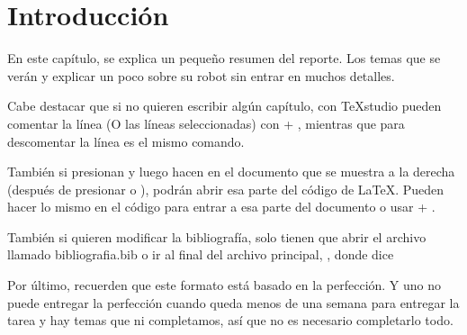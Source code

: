 \chapter{Introducción} \label{chap:introduccion}

En este capítulo, se explica un pequeño resumen del reporte. Los temas que se verán y explicar un poco sobre su robot sin entrar en muchos detalles.

Cabe destacar que si no quieren escribir algún capítulo, con \TeX studio pueden comentar la línea (O las líneas seleccionadas) con  + , mientras que para descomentar la línea es el mismo comando.

También si presionan  y luego hacen  en el documento que se muestra a la derecha (después de presionar  o ), podrán abrir esa parte del código de \LaTeX. Pueden hacer lo mismo en el código para entrar a esa parte del documento o usar  + .

También si quieren modificar la bibliografía, solo tienen que abrir el archivo llamado bibliografia.bib o ir al final del archivo principal, , donde dice

%		
%	

Por último, recuerden que este formato está basado en la perfección. Y uno no puede entregar la perfección cuando queda menos de una semana para entregar la tarea y hay temas que ni completamos, así que no es necesario completarlo todo.